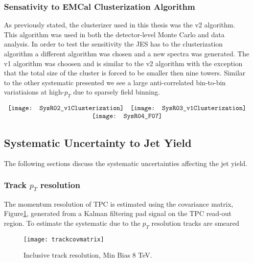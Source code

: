 \subsubsection{Sensativity to EMCal Clusterization Algorithm}
As previously stated, the clusterizer used in this thesis was the v2 algorithm. This algorithm was used in both the detector-level Monte Carlo and data analysis.  In order to test the sensitivity the JES has to the clusterization algorithm a different algorithm was chosen and a new spectra was generated.  The v1 algorithm was choosen and is similar to the v2 algorithm with the exception that the total size of the cluster is forced to be smaller then nine towers.  Similar to the other systematic presented we see a large anti-correlated bin-to-bin variatiaions at high-$p_{T}$ due to sparsely field binning.  

\begin{figure*}[t!]
$\begin{array}{rl}
    \texttt{[image: SysR02\_v1Clusterization]} &
    \texttt{[image: SysR03\_v1Clusterization]}\\
    \multicolumn{2}{c}{\texttt{[image: SysR04\_F07]}}
\end{array}$
\caption[Systematic due to clusterization algorithm.]{\label{fig:cluseff}Systematic due to EMCal clusterization algorithm; R = 0.2 \textit{(top left)}, R = 0.3 \textit{(top right)}, R = 0.4 \textit{(bottom)}.}
\end{figure*}

\subsection{Systematic Uncertainty to Jet Yield}
The following sections discuss the systematic uncertainties affecting the jet yield.

\subsubsection{Track $p_{T}$ resolution}
The momentum resolution of TPC is estimated using the covariance matrix, Figure\ref{fig:trackpcovmatrix}, generated from a Kalman filtering\cite{Fruhwirth:1987fm} pad signal on the TPC read-out region.  To estimate the systematic due to the $p_{T}$ resolution tracks are smeared 

\begin{figure}[h]
\texttt{[image: trackcovmatrix]}
\centering
\caption{Inclusive track resolution, Min Bias 8 TeV.}
\label{fig:trackpcovmatrix}
\end{figure}


